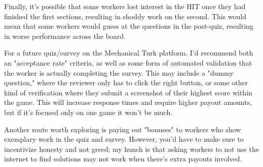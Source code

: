 			Finally, it's possible that some workers lost interest in the HIT once they had finished the first sections, resulting in shoddy work on the second. This would mean that some workers would guess at the questions in the post-quiz, resulting in worse performance across the board.

			For a future quiz/survey on the Mechanical Turk platform, I'd recommend both an "acceptance rate" criteria, as well as some form of automated validation that the worker is actually completing the survey. This may include a "dummy question," where the reviewer only has to click the right button, or some other kind of verification where they submit a screenshot of their highest score within the game. This will increase response times and require higher payout amounts, but if it's focused only on one game it won't be much.

			Another route worth exploring is paying out "bonuses" to workers who show exemplary work in the quiz and survey. However, you'd have to make sure to incentivize honesty and not greed; my hunch is that asking workers to not use the internet to find solutions may not work when there's extra payouts involved.